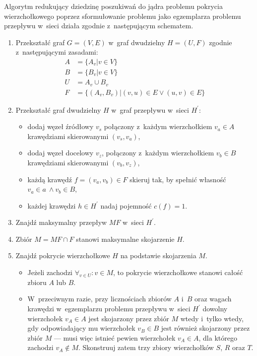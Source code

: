 Algorytm redukujący dziedzinę poszukiwań do jądra problemu pokrycia wierzchołkowego poprzez sformułowanie problemu jako egzemplarza problemu przepływu w~sieci działa zgodnie z~następującym schematem.
\begin{enumerate}
  \item Przekształć graf $G=(V,E)$ w~graf dwudzielny $H=(U,F)$ zgodnie z~następującymi zasadami:
  \begin{align*}
    A&=\{A_v|v \in V\}\\
    B&=\{B_v|v \in V\}\\
    U&=A_v \cup B_v\\
    F&=\{(A_v, B_v)|(v,u) \in E \lor (u,v) \in E\}
  \end{align*}
  \item Przekształć graf dwudzielny $H$ w~graf przepływu w~sieci $H^\prime$:
    \begin{itemize}
      \item dodaj węzeł źródłowy $v_s$ połączony z~każdym wierzchołkiem $v_a \in A$ krawędziami skierowanymi $(v_s, v_a)$,
      \item dodaj węzeł docelowy $v_z$, połączony z~każdym wierzchołkiem $v_b \in B$ krawędziami skierowanymi $(v_b, v_z)$,
      \item każdą krawędź $f=(v_a, v_b) \in F$ skieruj tak, by spełnić własność $v_a \in a~\land v_b \in B$,
      \item każdej krawędzi $h \in H^\prime$ nadaj pojemność $c(f)=1$.
    \end{itemize}
  \item Znajdź maksymalny przepływ $MF$ w~sieci $H^\prime$.
  \item Zbiór $M=MF \cap F$ stanowi maksymalne skojarzenie $H$.
  \item Znajdź pokrycie wierzchołkowe $H$ na podstawie skojarzenia $M$.
    \begin{itemize}
      \item Jeżeli zachodzi $\forall_{v \in U}:{v \in M}$, to pokrycie wierzchołkowe stanowi całość zbioru $A$ lub $B$.
      \item W~przeciwnym razie, przy licznościach zbiorów $A$ i~$B$ oraz wagach krawędzi w~egzemplarzu problemu przepływu w~sieci $H^\prime$ dowolny wierzchołek $v_A \in A$ jest skojarzony przez zbiór $M$ wtedy i~tylko wtedy, gdy odpowiadający mu wierzchołek $v_B \in B$ jest również skojarzony przez zbiór $M$ --- musi więc istnieć pewien wierzchołek $v_A \in A$, dla którego zachodzi $v_A \notin M$.
        Skonstruuj zatem trzy zbiory wierzchołków $S$, $R$ oraz $T$.

\end{itemize}
\end{enumerate}
